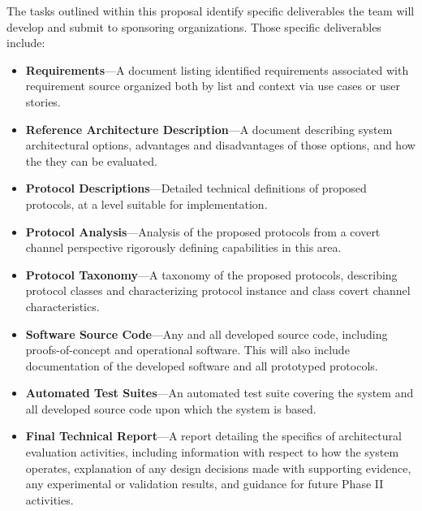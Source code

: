 \documentclass{sbir}
\begin{document}
The tasks outlined within this proposal identify specific deliverables the team will develop and submit to sponsoring organizations. Those specific deliverables include:
\vspace{-0.1in}
\begin{itemize}
\item {\bf Requirements}---A document listing identified requirements associated with requirement source organized both by list and context via use cases or user stories.
\item {\bf Reference Architecture Description}---A document describing system architectural options, advantages and disadvantages of those options, and how the they can be evaluated.
\item{\bf Protocol Descriptions}---Detailed technical definitions of proposed protocols, at a level suitable for implementation.
\item{\bf Protocol Analysis}---Analysis of the proposed protocols from a covert channel perspective rigorously defining capabilities in this area.
\item{\bf Protocol Taxonomy}---A taxonomy of the proposed protocols, describing protocol classes and characterizing protocol instance and class covert channel characteristics.
\item {\bf Software Source Code}---Any and all developed source code, including proofs-of-concept and operational software. This will also include documentation of the developed software and all prototyped protocols.
\item {\bf Automated Test Suites}---An automated test suite covering the system and all developed source code upon which the system is based.
\item {\bf Final Technical Report}---A report detailing the specifics of architectural evaluation activities, including information with respect to how the system operates, explanation of any design decisions made with supporting evidence, any experimental or validation results, and guidance for future Phase II activities.
\end{itemize}

\end{document}
